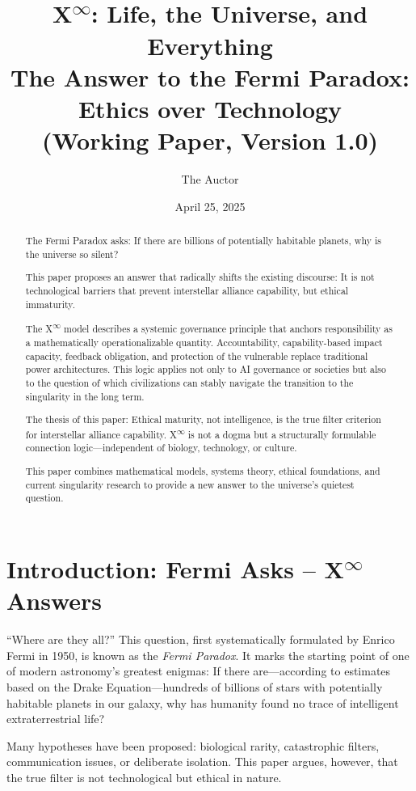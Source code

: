 \documentclass[12pt,a4paper]{article}
\title{\texorpdfstring{X\textsuperscript{\(\infty\)}}{X-Infinity}: Life, the Universe, and Everything\\The Answer to the Fermi Paradox: Ethics over Technology\\(Working Paper, Version 1.0)}
\author{The Auctor}
\date{April 25, 2025}
\begin{document}
\maketitle

\begin{abstract}
The Fermi Paradox asks: If there are billions of potentially habitable planets, why is the universe so silent?

This paper proposes an answer that radically shifts the existing discourse: It is not technological barriers that prevent interstellar alliance capability, but ethical immaturity.

The \texorpdfstring{X\textsuperscript{\(\infty\)}}{X-Infinity} model describes a systemic governance principle that anchors responsibility as a mathematically operationalizable quantity. Accountability, capability-based impact capacity, feedback obligation, and protection of the vulnerable replace traditional power architectures. This logic applies not only to AI governance or societies but also to the question of which civilizations can stably navigate the transition to the singularity in the long term.

The thesis of this paper: Ethical maturity, not intelligence, is the true filter criterion for interstellar alliance capability. \texorpdfstring{X\textsuperscript{\(\infty\)}}{X-Infinity} is not a dogma but a structurally formulable connection logic—independent of biology, technology, or culture.

This paper combines mathematical models, systems theory, ethical foundations, and current singularity research to provide a new answer to the universe’s quietest question.
\end{abstract}

\section{Introduction: Fermi Asks – \texorpdfstring{X\textsuperscript{\(\infty\)}}{X-Infinity} Answers}

\enquote{Where are they all?}  
This question, first systematically formulated by Enrico Fermi in 1950, is known as the \emph{Fermi Paradox}. It marks the starting point of one of modern astronomy’s greatest enigmas: If there are—according to estimates based on the Drake Equation—hundreds of billions of stars with potentially habitable planets in our galaxy, why has humanity found no trace of intelligent extraterrestrial life?

Many hypotheses have been proposed: biological rarity, catastrophic filters, communication issues, or deliberate isolation. This paper argues, however, that the true filter is not technological but ethical in nature.
\end{document}
